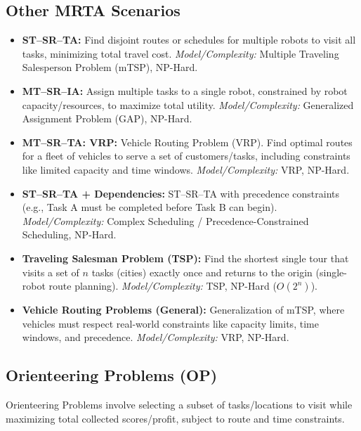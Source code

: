 \subsection*{Other MRTA Scenarios}
\begin{itemize}
    \item \textbf{ST–SR–TA:} Find disjoint routes or schedules for multiple robots to visit all tasks, minimizing total travel cost. \textit{Model/Complexity:} Multiple Traveling Salesperson Problem (mTSP), NP-Hard.

    \item \textbf{MT–SR–IA:} Assign multiple tasks to a single robot, constrained by robot capacity/resources, to maximize total utility. \textit{Model/Complexity:} Generalized Assignment Problem (GAP), NP-Hard.

    \item \textbf{MT–SR–TA: VRP:} Vehicle Routing Problem (VRP). Find optimal routes for a fleet of vehicles to serve a set of customers/tasks, including constraints like limited capacity and time windows. \textit{Model/Complexity:} VRP, NP-Hard.

    \item \textbf{ST–SR–TA + Dependencies:} ST–SR–TA with precedence constraints (e.g., Task A must be completed before Task B can begin). \textit{Model/Complexity:} Complex Scheduling / Precedence-Constrained Scheduling, NP-Hard.

    \item \textbf{Traveling Salesman Problem (TSP):} Find the shortest single tour that visits a set of \(n\) tasks (cities) exactly once and returns to the origin (single-robot route planning). \textit{Model/Complexity:} TSP, NP-Hard (\(O(2^n)\)).

    \item \textbf{Vehicle Routing Problems (General):} Generalization of mTSP, where vehicles must respect real-world constraints like capacity limits, time windows, and precedence. \textit{Model/Complexity:} VRP, NP-Hard.
\end{itemize}

\subsection*{Orienteering Problems (OP)}

Orienteering Problems involve selecting a subset of tasks/locations to visit while maximizing total collected scores/profit, subject to route and time constraints.

